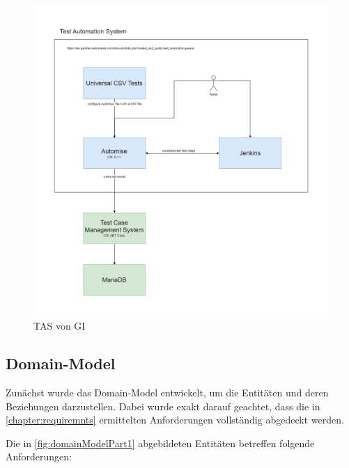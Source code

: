 \documentclass[a4paper, fontsize=11pt, parskip=half, twoside, headings=openright]{scrreprt}
\begin{document}
	\begin{figure}[ht]
		\centering
		\includegraphics[scale=0.34]{assets/TestTechnologiesOverview.drawio.png}
		\caption{\ac{TAS} von \ac{GI}}
		\label{fig:testAutomationSystem}
	\end{figure}
	
	\subsection{Domain-Model} \label{subsec:domainModel}
	Zunächst wurde das Domain-Model entwickelt, um die Entitäten und deren Beziehungen darzustellen.
	Dabei wurde exakt darauf geachtet, dass die in \autoref{chapter:requiremnts} ermittelten Anforderungen vollständig abgedeckt werden.

	Die in \autoref{fig:domainModelPart1} abgebildeten Entitäten betreffen folgende Anforderungen:
	
\end{document}
